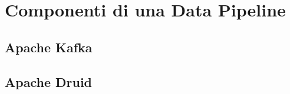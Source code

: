 \chapter{Componenti di una Data Pipeline}\label{cap:Componenti di una Data Pipeline}
\section{Apache Kafka}

\section{Apache Druid}
